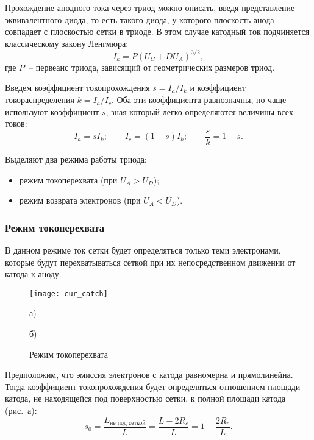 Прохождение анодного тока через триод можно описать, введя представление
эквивалентного диода, то есть такого диода, у которого плоскость анода
совпадает с плоскостью сетки в триоде. В этом случае катодный ток подчиняется
классическому закону Ленгмюра:
\begin{equation}
  I_k = P(U_C + DU_A)^{3/2},
  \label{eq1}
\end{equation}
где  \( P \)~-- первеанс триода, зависящий от геометрических
размеров триод.

Введем коэффициент токопрохождения \( s = I_a/I_k \) и коэффициент
токораспределения \( k = I_a/I_c \). Оба эти коэффициента равнозначны, но чаще
используют коэффициент \( s \), зная который легко определяются величины всех
токов:
\[
  I_a = s I_k; \qquad I_c = (1 - s) I_k; \qquad \frac{s}{k} = 1 - s.
\]

Выделяют два режима работы триода:
\vspace{-.5em}
\begin{itemize}
  \itemsep -.5pt
  \item режим токоперехвата (при \( U_A > U_D \));
  \item режим возврата электронов (при \( U_A < U_D \)).
\end{itemize}

\subsubsection{Режим токоперехвата}

В данном режиме ток сетки будет определяться только теми электронами, которые
будут перехватываться сеткой при их непосредственном движении от катода к аноду.

\begin{figure}[h!]
  \center
  \texttt{[image: cur\_catch]}\\
  \vspace{-1em}\parbox{1em}{\small а)}\hspace{8em}\parbox{1em}{\small б)}
  \caption{Режим токоперехвата}
  \label{picCC}
\end{figure}

Предположим, что эмиссия электронов с катода равномерна и прямолинейна.
Тогда коэффициент токопрохождения будет определяться отношением площади катода, не
находящейся под поверхностью сетки, к полной площади катода (рис.~а):
\begin{equation}
  s_0 = \frac{L_\text{не под сеткой}}{L} = \frac{L - 2 R_c}{L} =
    1 - \frac{2 R_c}{L}.
  \label{eqs0}
\end{equation}

